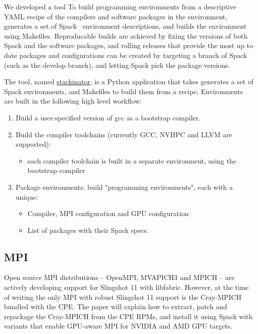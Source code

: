 
We developed a tool To build programming environments from a descriptive YAML recipe of the compilers and software packages in the environment, generates a set of Spack~\cite{gamblin:sc15} environment descriptions, and builds the environment using Makefiles.
Reproducable builds are achieved by fixing the versions of both Spack and the software packages, and rolling releases that provide the most up to date packages and configurations can be created by targeting a branch of Spack (such as the develop branch), and letting Spack pick the package versions.

The tool, named \href{https://github.com/eth-cscs/stackinator}{stackinator}, is a Python application that takes generates a set of Spack environments, and Makefiles to build them from a recipe.
Environments are built in the following high level workflow:
\begin{enumerate}
    \item Build a user-specified version of gcc as a bootstrap compiler.
    \item Build the compiler toolchains (currently GCC, NVHPC and LLVM are supported):
    \begin{itemize}
        \item each compiler toolchain is built in a separate environment, using the bootstrap compiler
    \end{itemize}
    \item Package environments: build "programming environments", each with a unique:
    \begin{itemize}
        \item Compiler, MPI configuration and GPU configuration
        \item List of packages with their Spack specs.
    \end{itemize}
\end{enumerate}

\subsection{MPI}
Open source MPI distributions -- OpenMPI, MVAPICH3 and MPICH -- are actively developing support for Slingshot 11 with libfabric.
However, at the time of writing the only MPI with robust Slingshot 11 support is the Cray-MPICH bundled with the CPE.
The paper will explain how to extract, patch and repackage the Cray-MPICH from the CPE RPMs, and install it using Spack with variants that enable GPU-aware MPI for NVIDIA and AMD GPU targets.

